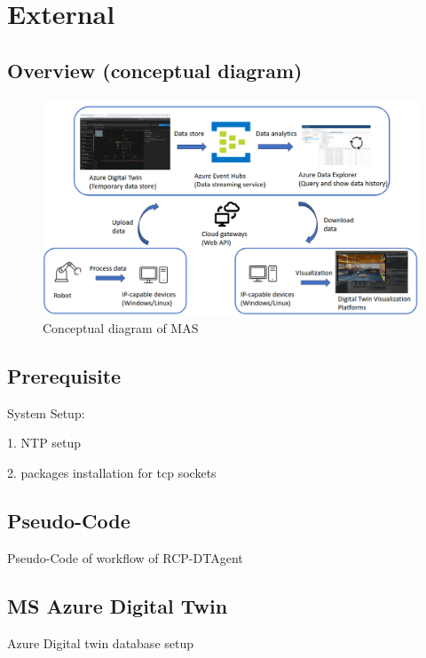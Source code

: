 \section{External}
\subsection{Overview (conceptual diagram)}

\begin{figure}[htb]
\includegraphics[width=16cm]{figures/DT_Conceptual_Diagram.png}
\centering
\caption{Conceptual diagram of MAS\label{fig: DTConceptual}}
\end{figure}



\subsection{Prerequisite}
System Setup: 


1. NTP setup


2. packages installation for tcp sockets


\subsection{Pseudo-Code}
Pseudo-Code of workflow of RCP-DTAgent

\subsection{MS Azure Digital Twin}
Azure Digital twin database setup